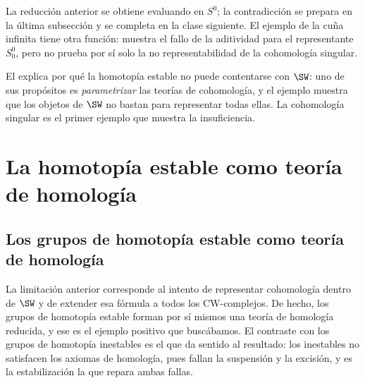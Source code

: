 \begin{nota}
   La reducción anterior se obtiene evaluando en $S^0$; la contradicción se prepara en la última subsección y se completa en la clase siguiente. El ejemplo de la cuña infinita tiene otra función: muestra el fallo de la aditividad para el representante $S^0_0$, pero no prueba por sí solo la no representabilidad de la cohomología singular.
\end{nota}

\begin{nota}
   El  explica por qué la homotopía estable no puede contentarse con $\SW$: uno de sus propósitos es \emph{parametrizar} las teorías de cohomología, y el ejemplo muestra que los objetos de $\SW$ no bastan para representar todas ellas. La cohomología singular es el primer ejemplo que muestra la insuficiencia.
\end{nota}

\section{La homotopía estable como teoría de homología}

\subsection{Los grupos de homotopía estable como teoría de homología}

La limitación anterior corresponde al intento de representar cohomología dentro de $\SW$ y de extender esa fórmula a todos los CW-complejos. De hecho, los grupos de homotopía estable forman por sí mismos una teoría de homología reducida, y ese es el ejemplo positivo que buscábamos. El contraste con los grupos de homotopía inestables es el que da sentido al resultado: los inestables no satisfacen los axiomas de homología, pues fallan la suspensión y la excisión, y es la estabilización la que repara ambas fallas.

